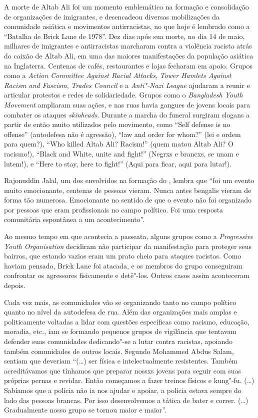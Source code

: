 A morte de Altab Ali foi um momento emblemático na formação e consolidação de organizações de imigrantes, e desencadeou diversas mobilizações da comunidade asiática e movimentos antirracistas, no que hoje é lembrado como a ``Batalha de Brick Lane de 1978''. Dez dias após sua morte, no dia 14 de maio, milhares de imigrantes e antirracistas marcharam contra a violência racista atrás do caixão de Altab Ali, em uma das maiores manifestações da população asiática na Inglaterra. Centenas de cafés, restaurantes e lojas fecharam em apoio. Grupos como a \emph{Action Committee Against Racial Attacks}, \emph{Tower Hamlets Against Racism and Fascism}, \emph{Trades Council} e a \emph{Anti"-Nazi League} ajudaram a reunir e articular protestos e redes de solidariedade. Grupos como o \emph{Bangladesh Youth Movement} ampliaram suas ações, e nas ruas havia gangues de jovens locais para combater os ataques \emph{skinheads}. Durante a marcha do funeral surgiram slogans a partir de então muito utilizados pelo movimento, como ``Self defense is no offense'' (autodefesa não é agressão), ``law and order for whom?'' (lei e ordem para quem?), ``Who killed Altab Ali? Racism!'' (quem matou Altab Ali? O racismo!), ``Black and White, unite and fight!'' (Negrxs e brancxs, se unam e lutem!), e ``Here to stay, here to fight!'' (Aqui para ficar, aqui para lutar!).

Rajonuddin Jalal, um dos envolvidos na formação do , lembra que ``foi um evento muito emocionante, centenas de pessoas vieram. Nunca antes bengalis vieram de forma tão numerosa. Emocionante no sentido de que o evento não foi organizado por pessoas que eram profissionais no campo político. Foi uma resposta comunitária espontânea a um acontecimento''.

Ao mesmo tempo em que acontecia a passeata, alguns grupos como a \emph{Progressive Youth Organisation} decidiram não participar da manifestação para proteger seus bairros, que estando vazios eram um prato cheio para ataques racistas. Como haviam pensado, Brick Lane foi atacada, e os membros do grupo conseguiram confrontar os agressores fisicamente e detê"-los. Outros casos assim aconteceram depois.

Cada vez mais, as comunidades vão se organizando tanto no campo político quanto no nível da autodefesa de rua. Além das organizações mais amplas e politicamente voltadas a lidar com questões específicas como racismo, educação, moradia, etc., iam se formando pequenos grupos de vigilância que tentavam defender suas comunidades dedicando"-se a lutar contra racistas, apoiando também comunidades de outros locais. Segundo Mohammed Abdus Salam, sentiam que deveriam ``(\ldots{}) ser física e intelectualmente resistentes. Também acreditávamos que tínhamos que preparar nossxs jovens para seguir com suas próprias pernas e revidar. Então começamos a fazer treinos físicos e kung"-fu. (\ldots{}) Sabíamos que a polícia não ia nos ajudar e apoiar, a polícia estava sempre do lado das pessoas brancas. Por isso desenvolvemos a tática de bater e correr. (\ldots{}) Gradualmente nosso grupo se tornou maior e maior''.

